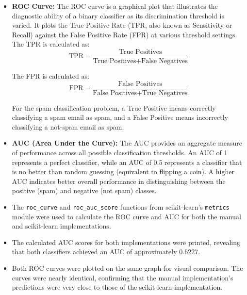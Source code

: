 \documentclass[12pt,letterpaper]{article}
\begin{document}
\begin{itemize}
    \item \textbf{ROC Curve:} The ROC curve is a graphical plot that illustrates the diagnostic ability of a binary classifier as its discrimination threshold is varied. It plots the True Positive Rate (TPR, also known as Sensitivity or Recall) against the False Positive Rate (FPR) at various threshold settings. The TPR is calculated as:
    \begin{equation}
    \text{TPR} = \frac{\text{True Positives}}{\text{True Positives} + \text{False Negatives}}
    \end{equation}
    
    The FPR is calculated as:
    \begin{equation}
    \text{FPR} = \frac{\text{False Positives}}{\text{False Positives} + \text{True Negatives}}
    \end{equation}
    
    For the spam classification problem, a True Positive means correctly classifying a spam email as spam, and a False Positive means incorrectly classifying a not-spam email as spam.
    
    \item \textbf{AUC (Area Under the Curve):} The AUC provides an aggregate measure of performance across all possible classification thresholds. An AUC of 1 represents a perfect classifier, while an AUC of 0.5 represents a classifier that is no better than random guessing (equivalent to flipping a coin). A higher AUC indicates better overall performance in distinguishing between the positive (spam) and negative (not spam) classes.
    
    \item The \texttt{roc\_curve} and \texttt{roc\_auc\_score} functions from scikit-learn's \texttt{metrics} module were used to calculate the ROC curve and AUC for both the manual and scikit-learn implementations.
    
    \item The calculated AUC scores for both implementations were printed, revealing that both classifiers achieved an AUC of approximately 0.6227.
    
    \item Both ROC curves were plotted on the same graph for visual comparison. The curves were nearly identical, confirming that the manual implementation's predictions were very close to those of the scikit-learn implementation.
\end{itemize}
\end{document}
